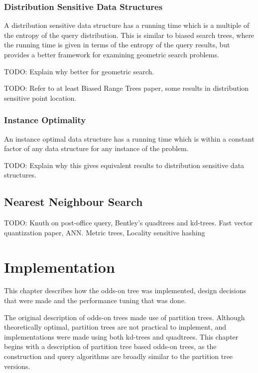 \documentclass[mcs]{scsthesis}
\begin{document}
\subsection{Distribution Sensitive Data Structures}

A distribution sensitive data structure has a running time which is a multiple 
of the entropy of the query distribution.  This is similar to biased search
trees, where the running time is given in terms of the entropy of the query
results, but provides a better framework for examining geometric search
problems.

TODO: Explain why better for geometric search.

TODO: Refer to at least Biased Range Trees paper, some results in distribution
sensitive point location.

\subsection{Instance Optimality}

An instance optimal data structure \cite{chan} has a running time which is
within a constant factor of any data structure for any instance of the problem.

TODO: Explain why this gives equivalent results to distribution sensitive data
structures.

\section{Nearest Neighbour Search}

TODO: Knuth on post-office query, Bentley's quadtrees and kd-trees.  Fast
vector quantization paper, ANN.  Metric trees, Locality sensitive hashing


\chapter{Implementation}

This chapter describes how the odds-on tree was implemented, design decisions
that were made and the performance tuning that was done.

The original description of odds-on trees made use of partition trees.  Although
theoretically optimal, partition trees are not practical to implement, and
implementations were made using both kd-trees and quadtrees.  This chapter
begins with a description of partition tree based odds-on trees, as the
construction and query algorithms are broadly similar to the partition tree
versions.
\end{document}
